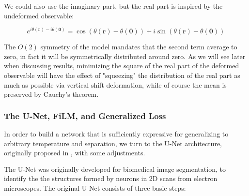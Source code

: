 \documentclass[12pt]{article}
\begin{document}
We could also use the imaginary part, but the real part is inspired by the undeformed observable:

\begin{equation*}
	e^{i\theta(\mathbf{r})-i\theta(\mathbf{0})} = \cos\left(\theta(\mathbf{r}) - \theta(\mathbf{0})\right) + i\sin\left(\theta(\mathbf{r}) - \theta(\mathbf{0})\right)
\end{equation*}

The $O(2)$ symmetry of the model mandates that the second term average to zero, in fact it will be symmetrically distributed around zero.
As we will see later when discussing results, minimizing the square of the real part of the deformed observable will have the effect of "squeezing" the distribution of the real part
as much as possible via vertical shift deformation, while of course the mean is preserved by Cauchy's theorem.

\subsubsection{The U-Net, FiLM, and Generalized Loss}

In order to build a network that is sufficiently expressive for generalizing to arbitrary temperature and separation, we turn to the 
U-Net architecture, originally proposed in \cite{ronneberger2015unetconvolutionalnetworksbiomedical}, with some adjustments.

The U-Net was originally developed for biomedical image segmentation, to identify the the structures formed by neurons in 
2D scans from electron microscopes. The original U-Net consists of three basic steps:
\end{document}
